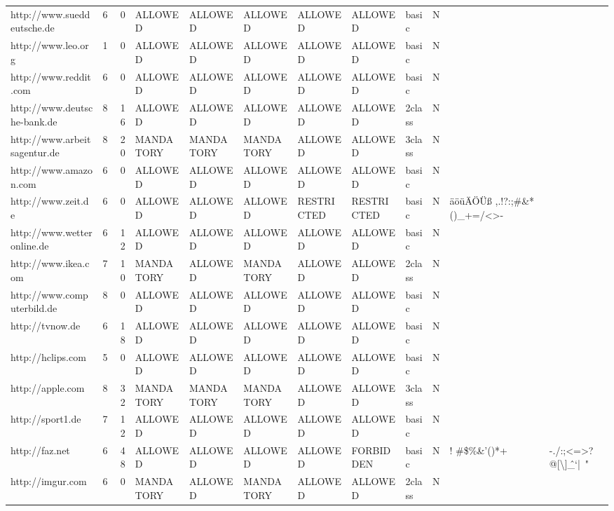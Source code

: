 \begin{table}[htbp]
{{\begin{tabular}{lrrlllllllrr}
    http://www.sueddeutsche.de & 6     & 0     & ALLOWED & ALLOWED & ALLOWED & ALLOWED & ALLOWED & basic & N     &       &  \\
    http://www.leo.org & 1     & 0     & ALLOWED & ALLOWED & ALLOWED & ALLOWED & ALLOWED & basic & N     &       &  \\
    http://www.reddit.com & 6     & 0     & ALLOWED & ALLOWED & ALLOWED & ALLOWED & ALLOWED & basic & N     &       &  \\
    http://www.deutsche-bank.de & 8     & 16    & ALLOWED & ALLOWED & ALLOWED & ALLOWED & ALLOWED & 2class & N     &       &  \\
    http://www.arbeitsagentur.de & 8     & 20    & MANDATORY & MANDATORY & MANDATORY & ALLOWED & ALLOWED & 3class & N     &       &  \\
    http://www.amazon.com & 6     & 0     & ALLOWED & ALLOWED & ALLOWED & ALLOWED & ALLOWED & basic & N     &       &  \\
    http://www.zeit.de & 6     & 0     & ALLOWED & ALLOWED & ALLOWED & RESTRICTED & RESTRICTED & basic & N     & \multicolumn{1}{l}{äöüÄÖÜß ,.!?:;\#\&* ()\_+=/<>-} &  \\
    http://www.wetteronline.de & 6     & 12    & ALLOWED & ALLOWED & ALLOWED & ALLOWED & ALLOWED & basic & N     &       &  \\
    http://www.ikea.com & 7     & 10    & MANDATORY & ALLOWED & MANDATORY & ALLOWED & ALLOWED & 2class & N     &       &  \\
    http://www.computerbild.de & 8     & 0     & ALLOWED & ALLOWED & ALLOWED & ALLOWED & ALLOWED & basic & N     &       &  \\
    http://tvnow.de & 6     & 18    & ALLOWED & ALLOWED & ALLOWED & ALLOWED & ALLOWED & basic & N     &       &  \\
    http://hclips.com & 5     & 0     & ALLOWED & ALLOWED & ALLOWED & ALLOWED & ALLOWED & basic & N     &       &  \\
    http://apple.com & 8     & 32    & MANDATORY & MANDATORY & MANDATORY & ALLOWED & ALLOWED & 3class & N     &       &  \\
    http://sport1.de & 7     & 12    & ALLOWED & ALLOWED & ALLOWED & ALLOWED & ALLOWED & basic & N     &       &  \\
    http://faz.net & 6     & 48    & ALLOWED & ALLOWED & ALLOWED & ALLOWED & FORBIDDEN & basic & N     & \multicolumn{1}{l}{! \#\$\%\&'()*+} & \multicolumn{1}{l}{-./:;<=>?@[\textbackslash{}]\^\_`{|}~"} \\
    http://imgur.com & 6     & 0     & MANDATORY & ALLOWED & MANDATORY & ALLOWED & ALLOWED & 2class & N     &       &  \\

\end{tabular}}}
\end{table}
